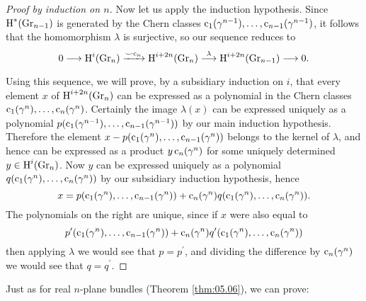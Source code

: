 \documentclass[../main]{subfiles}
\begin{document}
\begin{proof}[Proof by induction on $n$]
Now let us apply the induction hypothesis. Since $\operatorname{H}^\ast(\operatorname{Gr}_{n-1})$ is generated by the Chern classes $\operatorname{c}_1(\gamma^{n-1}), \dots, \operatorname{c}_{n-1}(\gamma^{n-1})$, it follows that the homomorphism $\lambda$ is surjective, so our sequence reduces to
\[
0 \longrightarrow \homology^i(\grassmannian_{n}) \varrightarrow{\smile \chernclass_n} \homology^{i+2n}(\grassmannian_{n}) \varrightarrow{\lambda} \homology^{i+2n}(\grassmannian_{n-1}) \longrightarrow 0. 
\]
Using this sequence, we will prove, by a subsidiary induction on $i$, that every element $x$ of $\operatorname{H}^{i+2n} (\operatorname{Gr}_{n})$ can be expressed  as a polynomial in the Chern classes $\operatorname{c}_{1}(\gamma^{n}), \dots, \operatorname{c}_{n}(\gamma^{n})$. Certainly the image $\lambda(x)$ can be expressed uniquely as a polynomial $p(\operatorname{c}_{1}(\gamma^{n-1}), \dots, \operatorname{c}_{n-1}(\gamma^{n-1}))$ by our main induction hypothesis. Therefore the element $x-p(\operatorname{c}_{1}(\gamma^{n}), \dots, \operatorname{c}_{n-1}(\gamma^{n}))$ belongs to the kernel of $\lambda$, and hence can be expressed as a product $y\operatorname{c}_{n}(\gamma^{n})$ for some uniquely determined \newline $y \in \operatorname{H}^{i}(\operatorname{Gr}_{n})$. Now $y$ can be expressed uniquely as a polynomial $q(\operatorname{c}_{1}(\gamma^{n}), \dots, \operatorname{c}_{n}(\gamma^{n}))$ by our subsidiary induction hypothesis, hence
\[
x=p(\operatorname{c}_{1}(\gamma^{n}), \dots, \operatorname{c}_{n-1}(\gamma^{n}))+\operatorname{c}_{n}(\gamma^{n}) q(\operatorname{c}_{1}(\gamma^{n}), \dots, \operatorname{c}_{n}(\gamma^{n})).
\]
The polynomials on the right are unique, since if $x$ were also equal to 
\[
p^{\prime}(\operatorname{c}_{1}(\gamma^{n}), \dots, \operatorname{c}_{n-1}(\gamma^{n}))+\operatorname{c}_{n}(\gamma^{n}) q^{\prime}(\operatorname{c}_{1}(\gamma^{n}), \dots, \operatorname{c}_{n}(\gamma^{n}))
\]
then applying $\lambda$ we would see that $p=p^{\prime}$, and dividing the difference by $\operatorname{c}_{n}(\gamma^{n})$ we would see that $q=q^{\prime}$.
\end{proof}

Just as for real $n$-plane bundles (Theorem \ref{thm:05.06}), we can prove:
\end{document}
